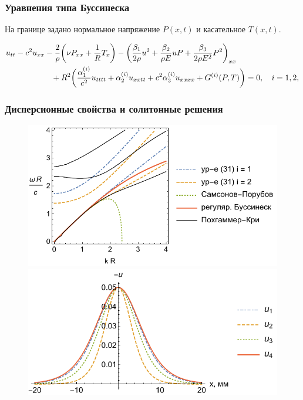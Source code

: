 \documentclass{beamer}
\begin{document}
\begin{frame} \frametitle{Уравнения типа Буссинеска}
На границе задано нормальное напряжение $P(x,t)$ и касательное $T(x,t)$.

\begin{equation}\nonumber
\begin{split}
&u_{tt} - c^2 u_{xx} - \frac{2}{\rho}\bigg(\nu P_{xx} + \frac1R T_x\bigg) - \left(\frac{\beta_1}{2\rho} u^2 + \frac{\beta_2}{\rho E} u P + \frac{\beta_3}{2\rho E^2} P^2\right)_{xx}\\
&\hspace{20mm} + R^2 \bigg(\frac{\alpha_1^{(i)}}{c^2} u_{tttt} + \alpha_2^{(i)} u_{xxtt} + c^2\alpha_3^{(i)} u_{xxxx} + G^{(i)}(P, T) \bigg) = 0, \quad i = 1,2,
\end{split}
\end{equation}
\end{frame}


\begin{frame} \frametitle{Дисперсионные свойства и солитонные решения}
\begin{figure}
	\flushleft
	\includegraphics[width=0.49\linewidth]{figures/2_DispColor}
	\includegraphics[width=.49\linewidth]{figures/3a_FourSolitonsColor}
\end{figure}

\end{frame}
\end{document}
